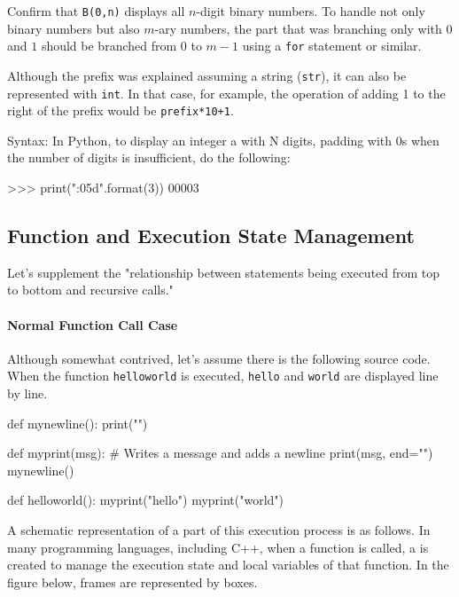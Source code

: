 Confirm that \texttt{B(0,n)} displays all $n$-digit binary numbers. To handle not only binary numbers but also $m$-ary numbers, the part that was branching only with $0$ and $1$ should be branched from $0$ to $m-1$ using a \texttt{for} statement or similar.

Although the prefix was explained assuming a string (\texttt{str}), it can also be represented with \texttt{int}. In that case, for example, the operation of adding 1 to the right of the prefix would be \texttt{prefix*10+1}.

Syntax: In Python, to display an integer a with N digits, padding with 0s when the number of digits is insufficient, do the following:
\begin{pybox}
>>> print("{:05d}".format(3))
00003
\end{pybox}
\subsection{Function and Execution State Management}\label{section:stackframe}

Let's supplement the "relationship between statements being executed from top to bottom and recursive calls."

\paragraph{Normal Function Call Case}

Although somewhat contrived, let's assume there is the following source code. When the function \texttt{helloworld} is executed, \texttt{hello} and \texttt{world} are displayed line by line.
\begin{pybox}
def mynewline():
    print("")

def myprint(msg): # Writes a message and adds a newline
    print(msg, end="")
    mynewline()

def helloworld():
    myprint("hello")
    myprint("world")
\end{pybox}

A schematic representation of a part of this execution process is as follows.
In many programming languages, including C++, when a function is called, a  is created to manage the execution state and local variables of that function. In the figure below, frames are represented by boxes.

